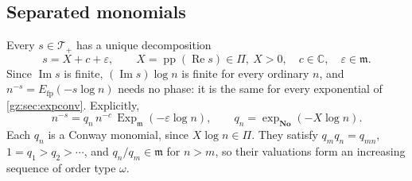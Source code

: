 \documentclass[11pt,a4paper]{article}
\numberwithin{equation}{section}
\theoremstyle{definition}
\theoremstyle{remark}
\newcommand{\No}{\mathbf{No}}
\newcommand{\C}{\mathbb C}
\newcommand{\mm}{\mathfrak m}
\newcommand{\eps}{\varepsilon}
\renewcommand{\Re}{\operatorname{Re}}
\renewcommand{\Im}{\operatorname{Im}}
\newcommand{\pp}{\operatorname{pp}}
\newcommand{\Ex}{\operatorname{Exp}_{\mm}}
\newcommand{\Efp}{E_{\mathrm{fp}}}
\newcommand{\Tp}{\mathcal T_{+}}
\begin{document}
\subsection{Separated monomials}
Every $s\in\Tp$ has a unique decomposition
\begin{equation}\label{gz:eq:sdecomp}
s=X+c+\eps,\qquad X=\pp(\Re s)\in\Pi,\ X>0,\quad c\in\C,\quad\eps\in\mm .
\end{equation}
Since $\Im s$ is finite, $(\Im s)\log n$ is finite for every ordinary $n$,
and $n^{-s}=\Efp(-s\log n)$ needs no phase: it is the same for every
exponential of \cref{gz:sec:expconv}. Explicitly,
\begin{equation}\label{gz:eq:qn}
n^{-s}=q_n\,n^{-c}\,\Ex(-\eps\log n),\qquad q_n=\exp_{\No}(-X\log n).
\end{equation}
Each $q_n$ is a Conway monomial, since $X\log n\in\Pi$. They satisfy
$q_mq_n=q_{mn}$, $1=q_1>q_2>\cdots$, and $q_n/q_m\in\mm$ for $n>m$, so their
valuations form an increasing sequence of order type $\omega$.
\end{document}
